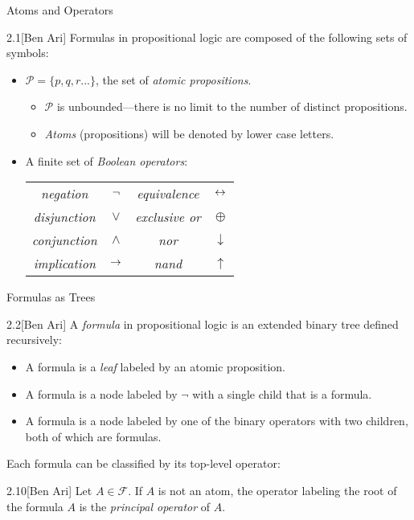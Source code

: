\documentclass[style=sailor,size=12pt]{powerdot}
\begin{document}
\begin{wideslide}[bm=,toc=]{Atoms and Operators}
\begin{defn}{2.1}[Ben Ari]
Formulas in propositional logic are composed of the following sets of symbols:
\begin{itemize}
\item $\mathcal{P} = \{p,q,r...\}$, the set of \emph{atomic propositions}.
\begin{itemize}
\item $\mathcal{P}$ is unbounded---there is no limit to the number of distinct
propositions.
\item \emph{Atoms} (propositions) will be denoted by lower case letters.
\end{itemize}
\item A finite set of \emph{Boolean operators}:
\begin{center}
\begin{tabular}{|c c||c c|}
\hline
\emph{negation}     & $\mathop{\neg}$  & \emph{equivalence}  & $\mathbin{\leftrightarrow}$  \\
\emph{disjunction}  & $\lor$  & \emph{exclusive or} & $\oplus$  \\
\emph{conjunction}  & $\land$ & \emph{nor}          & $\downarrow$  \\
\emph{implication}  & $\mathbin{\rightarrow}$   & \emph{nand}         & $\uparrow$  \\
\hline
\end{tabular}
\end{center}

\end{itemize}
\end{defn}
\end{wideslide}

\begin{wideslide}[bm=,toc=]{Formulas as Trees}
\begin{defn}{2.2}[Ben Ari]
A \emph{formula} in propositional logic is an extended binary tree defined recursively:
\begin{itemize}
\item A formula is a \emph{leaf} labeled by an atomic proposition.
\item A formula is a node labeled by $\neg$ with a single child that is a
formula.
\item A formula is a node labeled by one of the binary operators with two
children, both of which are formulas. 
\end{itemize}
\end{defn}
Each formula can be classified by its top-level operator:
\begin{defn}{2.10}[Ben Ari]
Let $A \in \mathcal{F}$. If $A$ is not an atom, the operator labeling
the root of the formula $A$ is the \emph{principal operator} of $A$.
\end{defn}

\end{wideslide}
\end{document}
